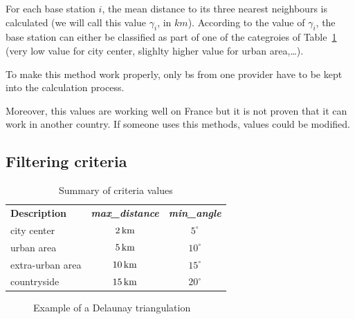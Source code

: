 \documentclass[lettersize,journal,english]{IEEEtran}
\begin{document}
For each base station $i$, the mean distance to its three nearest neighbours is calculated (we will call this value $\gamma_i$, in 
$\unit{km}$). According to the value of $\gamma_i$, the base station can either be classified as part of one of the categroies of 
Table~\ref{table:crit_summary} (very low value for city center, slighlty higher value for urban area,\dots).

To make this method work properly, only \acrshort{bs} from one provider have to be kept into the calculation process.

Moreover, this values are working well on France but it is not proven that it can work in another country. If someone uses this methods, 
values could be modified.

\subsection{Filtering criteria}

\begin{table}[!b]
    \centering
    \caption{Summary of criteria values}
    \label{table:crit_summary}
    \begin{tabular}{lcc}
        \toprule
        \textbf{Description} & \textbf{\emph{max\_distance}} & \textbf{\emph{min\_angle}} \\
        \cmidrule(lr){1-3}
        city center & $\unit[2]{km}$ & $5^\circ$ \\
        urban area & $\unit[5]{km}$ & $10^\circ$ \\
        extra-urban area & $\unit[10]{km}$ & $15^\circ$ \\
        countryside & $\unit[15]{km}$ & $20^\circ$ \\
        \bottomrule
    \end{tabular}
\end{table}

\begin{figure}[!t]
    \centering
    \caption{Example of a Delaunay triangulation}
    \label{fig:crit_pts}
\end{figure}
\end{document}
